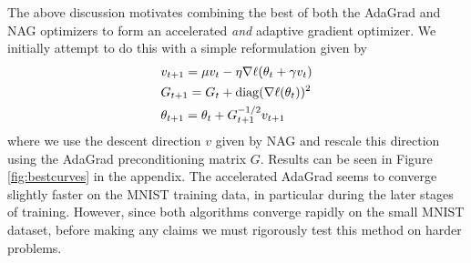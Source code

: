 The above discussion motivates combining the best of both the AdaGrad and
NAG optimizers to form an accelerated {\it and} adaptive gradient optimizer. We
initially attempt to do this with a simple reformulation given by
\begin{align*}
&v_{t+1} = \mu v_t - \eta \nabla \ell (\theta_t + \gamma v_t) \\
&G_{t+1} = G_{t} + \operatorname*{diag}(\nabla \ell (\theta_t))^2 \\
&\theta_{t+1} = \theta_t + G_{t+1}^{-1/2} v_{t+1}
\end{align*}
where we use the descent direction $v$ given by NAG and rescale this direction
using the AdaGrad preconditioning matrix $G$. Results can be seen in Figure
\ref{fig:bestcurves} in the appendix. The accelerated AdaGrad seems to converge
slightly faster on the MNIST training data, in particular during the later
stages of training.  However, since both algorithms converge rapidly on the
small MNIST dataset, before making any claims we must rigorously test this
method on harder problems.

